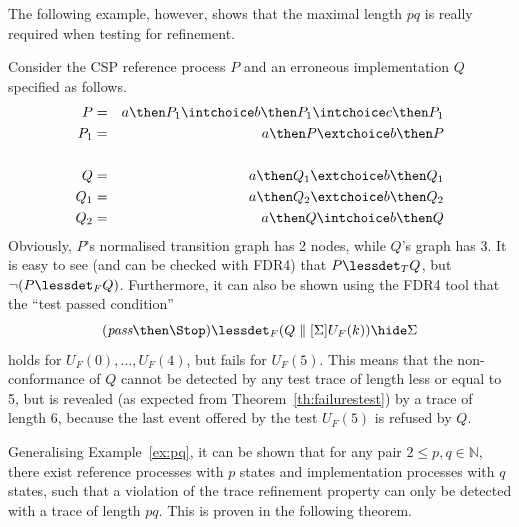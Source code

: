 The following example, however, shows that the maximal length $pq$ is really required 
when testing for refinement.
\begin{example}\label{ex:pq}
Consider the CSP reference process $P$ and an erroneous implementation $Q$ specified
as follows.
\begin{eqnarray*}
P & = & a \then P_1 \intchoice b \then P_1 \intchoice c \then P_1
\\
P_1 & = & a \then P \extchoice b\then P
\\ & &  \\
Q & = & a\then Q_1 \extchoice b\then Q_1
\\
Q_1 & = & a\then Q_2 \extchoice b\then Q_2
\\
Q_2 & = & a\then Q \intchoice b\then Q
\end{eqnarray*}
Obviously, $P$'s normalised transition graph has 2 nodes, 
while $Q$'s graph has 3.
It is easy to see (and can be checked with FDR4) that $P\lessdet_T Q$, but 
$\neg(P\lessdet_F Q)$. Furthermore, it can also be shown using the FDR4 tool that
the ``test passed condition'' 
\[
(\epass\then\Stop) \lessdet_F (Q\parallel[\Sigma] U_F(k))\hide \Sigma
\]
holds for $U_F(0),\dots,U_F(4)$, but fails for $U_F(5)$. This means that the
non-conformance of $Q$ cannot be detected by any test trace of length 
less or equal to 5, but is revealed (as expected from Theorem~\ref{th:failurestest})
by a trace of length 6, because the last event offered by the test $U_F(5)$ is 
refused by $Q$.
\xbox
\end{example}
%
Generalising Example~\ref{ex:pq}, it can be shown that for any pair 
$2\le p,q \in\mathbb{N}$,  
there exist reference processes with $p$ states
and implementation processes with $q$ states, such that 
a violation of the trace refinement property
can only be detected with a trace of length $pq$. This is proven in the following 
theorem.


